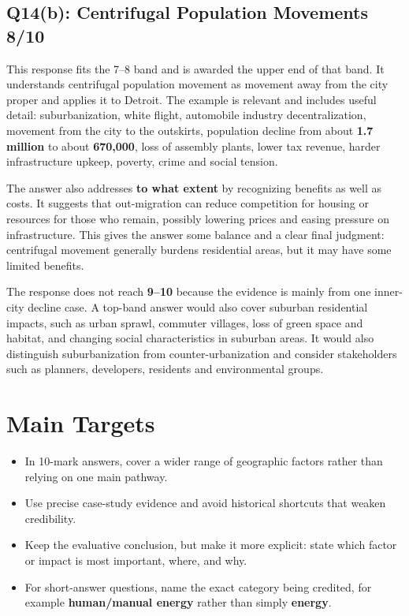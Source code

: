 \documentclass[11pt,a4paper]{article}
\newcommand{\term}[1]{\textcolor{HeadingBlue}{\textbf{#1}}}
\newcommand{\score}[1]{\textcolor{AccentTeal}{\textbf{#1}}}
\begin{document}
\subsection{Q14(b): Centrifugal Population Movements \score{8/10}}

This response fits the 7--8 band and is awarded the upper end of that band. It
understands centrifugal population movement as movement away from the city
proper and applies it to Detroit. The example is relevant and includes useful
detail: suburbanization, white flight, automobile industry decentralization,
movement from the city to the outskirts, population decline from about
\term{1.7 million} to about \term{670,000}, loss of assembly plants, lower tax
revenue, harder infrastructure upkeep, poverty, crime and social tension.

The answer also addresses \term{to what extent} by recognizing benefits as well
as costs. It suggests that out-migration can reduce competition for housing or
resources for those who remain, possibly lowering prices and easing pressure on
infrastructure. This gives the answer some balance and a clear final judgment:
centrifugal movement generally burdens residential areas, but it may have some
limited benefits.

The response does not reach \score{9--10} because the evidence is mainly from
one inner-city decline case. A top-band answer would also cover suburban
residential impacts, such as urban sprawl, commuter villages, loss of green
space and habitat, and changing social characteristics in suburban areas. It
would also distinguish suburbanization from counter-urbanization and consider
stakeholders such as planners, developers, residents and environmental groups.

\section{Main Targets}

\begin{itemize}
  \item In 10-mark answers, cover a wider range of geographic factors rather
  than relying on one main pathway.
  \item Use precise case-study evidence and avoid historical shortcuts that
  weaken credibility.
  \item Keep the evaluative conclusion, but make it more explicit: state which
  factor or impact is most important, where, and why.
  \item For short-answer questions, name the exact category being credited, for
  example \term{human/manual energy} rather than simply \term{energy}.
\end{itemize}
\end{document}
